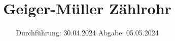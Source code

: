 

\subject{v703}
\title{Geiger-Müller Zählrohr}
\date{%
  Durchführung: 30.04.2024
  \hspace{3em}
  Abgabe: 05.05.2024
}



\maketitle
\thispagestyle{empty}
\tableofcontents
\newpage






\printbibliography{}

